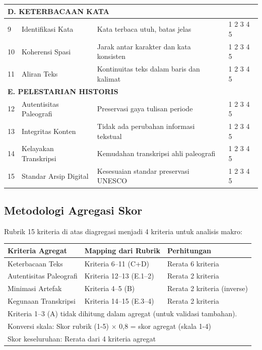 \begin{longtable}{|p{0.5cm}|p{3.5cm}|p{7cm}|p{1.5cm}|}
\multicolumn{4}{|l|}{\textbf{D. KETERBACAAN KATA}} \\
\hline
9 & Identifikasi Kata & Kata terbaca utuh, batas jelas & 1 2 3 4 5 \\
\hline
10 & Koherensi Spasi & Jarak antar karakter dan kata konsisten & 1 2 3 4 5 \\
\hline
11 & Aliran Teks & Kontinuitas teks dalam baris dan kalimat & 1 2 3 4 5 \\
\hline

\multicolumn{4}{|l|}{\textbf{E. PELESTARIAN HISTORIS}} \\
\hline
12 & Autentisitas Paleografi & Preservasi gaya tulisan periode & 1 2 3 4 5 \\
\hline
13 & Integritas Konten & Tidak ada perubahan informasi tekstual & 1 2 3 4 5 \\
\hline
14 & Kelayakan Transkripsi & Kemudahan transkripsi ahli paleografi & 1 2 3 4 5 \\
\hline
15 & Standar Arsip Digital & Kesesuaian standar preservasi UNESCO & 1 2 3 4 5 \\
\hline

\end{longtable}

\vspace{2em}


\subsection*{Metodologi Agregasi Skor}

Rubrik 15 kriteria di atas diagregasi menjadi 4 kriteria untuk analisis makro:

\begin{table}[h]
\centering
\small
\begin{tabular}{|l|l|l|}
\hline
\textbf{Kriteria Agregat} & \textbf{Mapping dari Rubrik} & \textbf{Perhitungan} \\
\hline
Keterbacaan Teks & Kriteria 6--11 (C+D) & Rerata 6 kriteria \\
Autentisitas Paleografi & Kriteria 12--13 (E.1--2) & Rerata 2 kriteria \\
Minimasi Artefak & Kriteria 4--5 (B) & Rerata 2 kriteria (inverse) \\
Kegunaan Transkripsi & Kriteria 14--15 (E.3--4) & Rerata 2 kriteria \\
\hline
\multicolumn{3}{l}{\footnotesize Kriteria 1--3 (A) tidak dihitung dalam agregat (untuk validasi tambahan).} \\
\multicolumn{3}{l}{\footnotesize Konversi skala: Skor rubrik (1-5) $\times$ 0,8 = skor agregat (skala 1-4)} \\
\multicolumn{3}{l}{\footnotesize Skor keseluruhan: Rerata dari 4 kriteria agregat} \\
\end{tabular}
\end{table}

